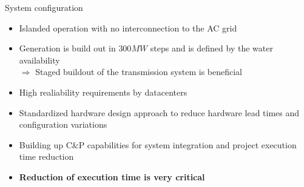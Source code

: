 \begin{frame}{System configuration}
  \begin{itemize}
    \setlength{\itemsep}{0.5em}
    \item Islanded operation with no interconnection to the AC grid
    \item Generation is build out in $300MW$ steps and is defined by the water availability \\ $\Rightarrow$ Staged buildout of the transmission system is beneficial
    \item High realiability requirements by datacenters
    \item Standardized hardware design approach to reduce hardware lead times and configuration variations
    \item Building up C\&P capabilities for system integration and project execution time reduction
    \item \textbf{Reduction of execution time is very critical}
  \end{itemize}
\end{frame}




